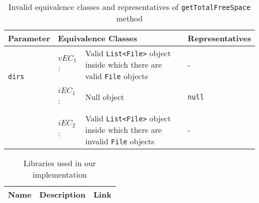\documentclass[sigchi]{acmart}
\begin{document}
\begin{table*}
  \caption{Invalid equivalence classes and representatives of \texttt{getTotalFreeSpace} method}
  \label{tab:libraries}
  \begin{tabular}{l|lp{5cm}|p{5cm}}
    \toprule
    \textbf{Parameter} & \multicolumn{2}{l|}{\textbf{Equivalence Classes}} & \textbf{Representatives} \\
    \midrule
    
	\multirow{3}{*}{\texttt{dirs}} & $vEC_1$: & Valid \texttt{List<File>} object inside which there are valid \texttt{File} objects & - \\    
    
    \\[-1em] 
    & $iEC_1$: & Null object & \texttt{null} \\ 
    
    \\[-1em]
    & $iEC_2$: & Valid \texttt{List<File>} object inside which there are invalid \texttt{File} objects & - \\
    
    \bottomrule
  \end{tabular}
\end{table*}



\begin{table*}
  \caption{Libraries used in our implementation}
  \label{tab:libraries}
  \begin{tabular}{l|l|l}
    \toprule
    Name & Description & Link \\
    \midrule
    
    
    
    
    \bottomrule
  \end{tabular}
\end{table*}



%
%

\appendix
\end{document}
